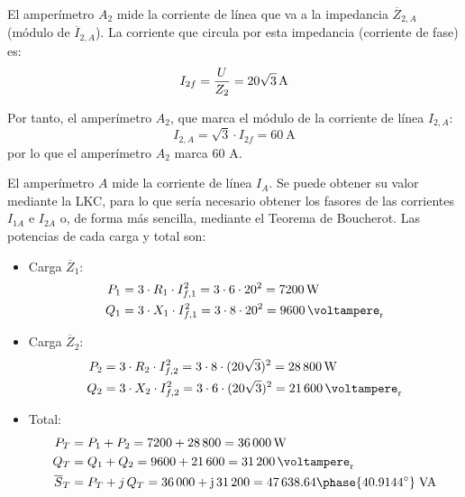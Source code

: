 \vspace{3mm}
El amperímetro $A_2$ mide la corriente de línea que va a la impedancia $\overline{Z}_{2,A}$ (módulo de $\overline{I}_{2,A}$). La corriente que circula por esta impedancia (corriente de fase) es:
\begin{equation*}
    I_{2f} = \frac{U}{Z_2} = \qty[parse-numbers = false]{20\sqrt{3}}{\ampere}
\end{equation*}

Por tanto, el amperímetro $A_2$, que marca el módulo de la corriente de línea $I_{2,A}$: 
\begin{equation*}
    I_{2,A}= \sqrt{3}\cdot I_{2f} = \qty{60}{\ampere}
\end{equation*}
por lo que el amperímetro $A_2$ marca 60 A.

\vspace{3mm}
El amperímetro $A$ mide la corriente de línea $I_A$. Se puede obtener su valor mediante la LKC, para lo que sería necesario obtener los fasores de las corrientes $I_{1A}$ e $I_{2A}$ o, de forma más sencilla, mediante el Teorema de Boucherot. Las potencias de cada carga y total son:

\begin{itemize}
    \item Carga $\overline{Z}_1$:
    \begin{align*}
        P_1&=3\cdot R_1\cdot I_{f,1}^2=3\cdot 6\cdot 20^2=\qty{7200}{\watt}\\
        Q_1&=3\cdot X_1\cdot I_{f,1}^2=3\cdot 8\cdot 20^2=\qty{9600}{\voltampere_r}
    \end{align*}
    \item Carga $\overline{Z}_2$:
    \begin{align*}
        P_2&=3\cdot R_2\cdot I_{f,2}^2=3\cdot 8\cdot (20\sqrt{3})^2=\qty{28800}{\watt}\\
        Q_2&=3\cdot X_2\cdot I_{f,2}^2=3\cdot 6\cdot (20\sqrt{3})^2=\qty{21600}{\voltampere_r}
    \end{align*}
    \item Total:
    \begin{align*}
        P_T&=P_1+P_2=7200+28\,800=\qty{36000}{\watt}\\
        Q_T&=Q_1+Q_2=9600+21\,600=\qty{31200}{\voltampere_r}\\
        \overline{S}_T&=P_T+j\,Q_T={36\,000+\mathrm{j}\,31\,200 = 47\,638.64\phase{40.9144^\circ} \;\text{VA}}
    \end{align*}
\end{itemize}

